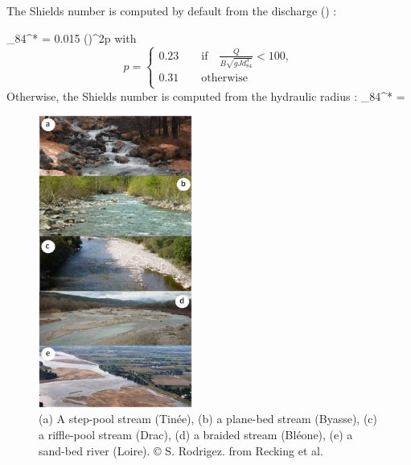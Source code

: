 The Shields number is computed by default from the discharge () :

\bequ
\theta_{84}^* = 0.015 {\left(\right)}^{2p} 
\eequ
with \[p = \left\{
        \begin{array}{ll}
            0.23 \qquad \textrm{if}\quad \frac{Q}{B\sqrt{gJd_{84}^3}}<100, \\
            0.31 \qquad \textrm{otherwise}\\
        \end{array}
    \right.\]
Otherwise, the Shields number is computed from the hydraulic radius :
\bequ
	\theta_{84}^* = 
\eequ

\begin{figure}[htb!]
    \centering
    \includegraphics[width=0.45\textwidth]{./graphics/recking2015.jpg}
    \caption{(a) A step-pool stream (Tinée), (b) a plane-bed stream (Byasse), (c) a riffle-pool stream (Drac), (d) a braided stream (Bléone), (e) a sand-bed river (Loire). © S. Rodrigez. from Recking et al. \cite{recking2015}}
    \label{fig:morpho_recking2015}
\end{figure}
